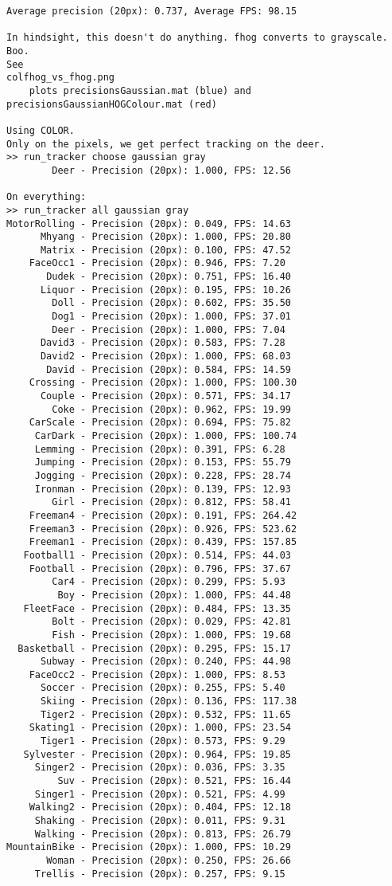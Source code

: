 \begin{lstlisting}
Average precision (20px): 0.737, Average FPS: 98.15

In hindsight, this doesn't do anything. fhog converts to grayscale. Boo.
See 
colfhog_vs_fhog.png
    plots precisionsGaussian.mat (blue) and precisionsGaussianHOGColour.mat (red)

Using COLOR.
Only on the pixels, we get perfect tracking on the deer.
>> run_tracker choose gaussian gray
        Deer - Precision (20px): 1.000, FPS: 12.56
        
On everything:
>> run_tracker all gaussian gray
MotorRolling - Precision (20px): 0.049, FPS: 14.63
      Mhyang - Precision (20px): 1.000, FPS: 20.80
      Matrix - Precision (20px): 0.100, FPS: 47.52
    FaceOcc1 - Precision (20px): 0.946, FPS: 7.20
       Dudek - Precision (20px): 0.751, FPS: 16.40
      Liquor - Precision (20px): 0.195, FPS: 10.26
        Doll - Precision (20px): 0.602, FPS: 35.50
        Dog1 - Precision (20px): 1.000, FPS: 37.01
        Deer - Precision (20px): 1.000, FPS: 7.04
      David3 - Precision (20px): 0.583, FPS: 7.28
      David2 - Precision (20px): 1.000, FPS: 68.03
       David - Precision (20px): 0.584, FPS: 14.59
    Crossing - Precision (20px): 1.000, FPS: 100.30
      Couple - Precision (20px): 0.571, FPS: 34.17
        Coke - Precision (20px): 0.962, FPS: 19.99
    CarScale - Precision (20px): 0.694, FPS: 75.82
     CarDark - Precision (20px): 1.000, FPS: 100.74
     Lemming - Precision (20px): 0.391, FPS: 6.28
     Jumping - Precision (20px): 0.153, FPS: 55.79
     Jogging - Precision (20px): 0.228, FPS: 28.74
     Ironman - Precision (20px): 0.139, FPS: 12.93
        Girl - Precision (20px): 0.812, FPS: 58.41
    Freeman4 - Precision (20px): 0.191, FPS: 264.42
    Freeman3 - Precision (20px): 0.926, FPS: 523.62
    Freeman1 - Precision (20px): 0.439, FPS: 157.85
   Football1 - Precision (20px): 0.514, FPS: 44.03
    Football - Precision (20px): 0.796, FPS: 37.67
        Car4 - Precision (20px): 0.299, FPS: 5.93
         Boy - Precision (20px): 1.000, FPS: 44.48
   FleetFace - Precision (20px): 0.484, FPS: 13.35
        Bolt - Precision (20px): 0.029, FPS: 42.81
        Fish - Precision (20px): 1.000, FPS: 19.68
  Basketball - Precision (20px): 0.295, FPS: 15.17
      Subway - Precision (20px): 0.240, FPS: 44.98
    FaceOcc2 - Precision (20px): 1.000, FPS: 8.53
      Soccer - Precision (20px): 0.255, FPS: 5.40
      Skiing - Precision (20px): 0.136, FPS: 117.38
      Tiger2 - Precision (20px): 0.532, FPS: 11.65
    Skating1 - Precision (20px): 1.000, FPS: 23.54
      Tiger1 - Precision (20px): 0.573, FPS: 9.29
   Sylvester - Precision (20px): 0.964, FPS: 19.85
     Singer2 - Precision (20px): 0.036, FPS: 3.35
         Suv - Precision (20px): 0.521, FPS: 16.44
     Singer1 - Precision (20px): 0.521, FPS: 4.99
    Walking2 - Precision (20px): 0.404, FPS: 12.18
     Shaking - Precision (20px): 0.011, FPS: 9.31
     Walking - Precision (20px): 0.813, FPS: 26.79
MountainBike - Precision (20px): 1.000, FPS: 10.29
       Woman - Precision (20px): 0.250, FPS: 26.66
     Trellis - Precision (20px): 0.257, FPS: 9.15


\end{lstlisting}
